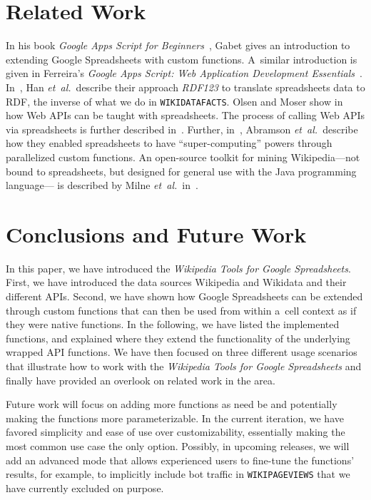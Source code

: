 \documentclass{sig-alternate-05-2015}
\begin{document}
\section{Related Work}

In his book \emph{Google Apps Script for Beginners}~\cite{gabet2014google}, Gabet
gives an introduction to extending Google Spreadsheets with custom functions.
A~similar introduction is given in Ferreira's
\emph{Google Apps Script: Web Application Development Essentials}~\cite{ferreira2014google}.
In~\cite{han2008rdf123}, Han \emph{et~al.}\ describe their approach \emph{RDF123}
to translate spreadsheets data to RDF, the inverse of what we do in \texttt{WIKIDATAFACTS}.
Olsen and Moser show in~\cite{olsen2013teaching} how Web APIs can be taught with spreadsheets.
The process of calling Web APIs via spreadsheets is further described in~\cite{patel2014spreadsheet}.
Further, in~\cite{abramson2001supercomputing}, Abramson \emph{et~al.}\ describe
how they enabled spreadsheets to have ``super-computing'' powers through
parallelized custom functions.
An open-source toolkit for mining Wikipedia---not bound to spreadsheets,
but designed for general use with the Java programming language---%
is described by Milne \emph{et~al.}\ in~\cite{milne2013toolkit}.

\section{Conclusions and Future Work}

In this paper, we have introduced the \emph{Wikipedia Tools for Google Spreadsheets}.
First, we have introduced the data sour\-ces Wikipedia and Wikidata and their different APIs.
Second, we have shown how Google Spreadsheets can be extended through custom functions
that can then be used from within a~cell context as if they were native functions.
In the following, we have listed the implemented functions,
and explained where they extend the functionality of the underlying wrapped API functions.
We have then focused on three different usage scenarios that
illustrate how to work with the \emph{Wikipedia Tools for Google Spreadsheets}
and finally have provided an overlook on related work in the area.

Future work will focus on adding more functions as need be
and potentially making the functions more parameterizable.
In the current iteration, we have favored simplicity and ease of use over customizability,
essentially making the most common use case the only option.
Possibly, in upcoming releases, we will add an advanced mode
that allows experienced users to fine-tune the functions' results,
for example, to implicitly include bot traffic in \texttt{WIKIPAGEVIEWS}
that we have currently excluded on purpose.
\end{document}
